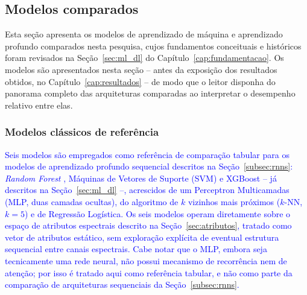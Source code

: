 \documentclass[times,final]{elsarticle}
\begin{document}
\subsection{Modelos comparados}
\label{sec:arquiteturas}
Esta seção apresenta os modelos de aprendizado de máquina e aprendizado profundo comparados nesta pesquisa, cujos fundamentos conceituais e históricos foram revisados na Seção~\ref{sec:ml_dl} do Capítulo~\ref{cap:fundamentacao}. Os modelos são apresentados nesta seção -- antes da exposição dos resultados obtidos, no Capítulo~\ref{cap:resultados} -- de modo que o leitor disponha do panorama completo das arquiteturas comparadas ao interpretar o desempenho relativo entre elas.
\subsubsection{Modelos clássicos de referência}
\label{subsec:modelos_classicos}
\textcolor{blue}{Seis modelos são empregados como referência de comparação tabular para os modelos de aprendizado profundo sequencial descritos na Seção~\ref{subsec:rnns}: \textit{Random Forest} \citep{breiman2001}, Máquinas de Vetores de Suporte (SVM) \citep{cortes1995} e XGBoost \citep{chen2016xgboost} -- já descritos na Seção~\ref{sec:ml_dl} --, acrescidos de um Perceptron Multicamadas (MLP, duas camadas ocultas), do algoritmo de $k$ vizinhos mais próximos ($k$-NN, $k=5$) e de Regressão Logística. Os seis modelos operam diretamente sobre o espaço de atributos espectrais descrito na Seção~\ref{sec:atributos}, tratado como vetor de atributos estático, sem exploração explícita de eventual estrutura sequencial entre canais espectrais. Cabe notar que o MLP, embora seja tecnicamente uma rede neural, não possui mecanismo de recorrência nem de atenção; por isso é tratado aqui como referência tabular, e não como parte da comparação de arquiteturas sequenciais da Seção~\ref{subsec:rnns}.}
\end{document}
